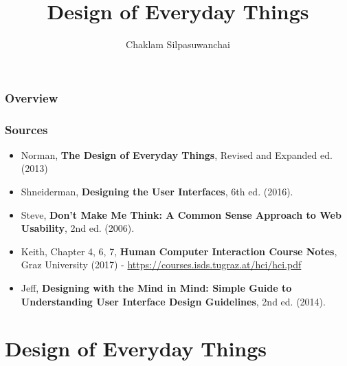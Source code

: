 \documentclass{beamer}
\title[Design of Everyday Things]{Design of Everyday Things} %
\author{Chaklam Silpasuwanchai} %
\institute[AIT] %
{
Asian Institute of Technology \\ %
\medskip
\textit{chaklam@ait.asia} %
}
\date{} %
\begin{document}
\begin{frame}
\titlepage %
\end{frame}

\begin{frame}
\frametitle{Overview} %
\footnotesize
\tableofcontents
\end{frame}


\begin{frame}
\frametitle{Sources} 
\begin{itemize}
	\item Norman, \textbf{The Design of Everyday Things}, Revised and Expanded ed. (2013)
	\item Shneiderman, \textbf{Designing the User Interfaces}, 6th ed. (2016). 
	\item Steve, \textbf{Don't Make Me Think: A Common Sense Approach to Web Usability}, 2nd ed. (2006). 
	\item Keith, Chapter 4, 6, 7, \textbf{Human Computer Interaction Course Notes}, Graz University (2017) - \url{https://courses.isds.tugraz.at/hci/hci.pdf}
	\item Jeff, \textbf{Designing with the Mind in Mind: Simple Guide to Understanding User Interface Design Guidelines}, 2nd ed. (2014).
\end{itemize}
\end{frame}


\section{Design of Everyday Things} %
\end{document}
